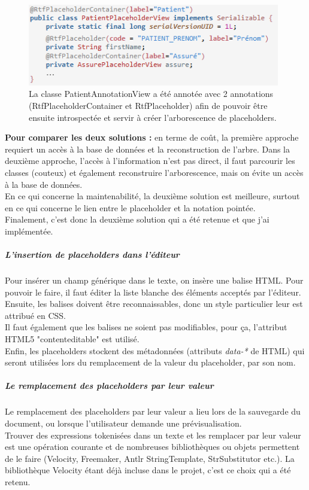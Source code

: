 \begin{figure}[H]
  \centering
  \includegraphics[width=11cm]{./img/annotations1}
  \caption{\label{fig:annotations} La classe PatientAnnotationView a été annotée avec 2 annotations (RtfPlaceholderContainer et RtfPlaceholder) afin de pouvoir être ensuite introspectée et servir à créer l'arborescence de placeholders.}
\end{figure}

\textbf{Pour comparer les deux solutions :} en terme de co\^ut, la première approche requiert un accès à la base de données et la reconstruction de l'arbre. Dans la deuxième approche, l'accès à l'information n'est pas direct, il faut parcourir les classes (couteux) et également reconstruire l'arborescence, mais on évite un accès à la base de données.\\
En ce qui concerne la maintenabilité, la deuxième solution est meilleure, surtout en ce qui concerne le lien entre le placeholder et la notation pointée.\\
Finalement, c'est donc la deuxième solution qui a été retenue et que j'ai implémentée.

\subparagraph*{L'insertion de placeholders dans l'éditeur}
Pour insérer un champ générique dans le texte, on insère une balise HTML. Pour pouvoir le faire, il faut éditer la liste blanche des éléments acceptés par l'éditeur. Ensuite, les balises doivent être reconnaissables, donc un style particulier leur est attribué en CSS.\\
Il faut également que les balises ne soient pas modifiables, pour ça, l'attribut HTML5 "contenteditable" est utilisé.\\
Enfin, les placeholders stockent des métadonnées  (attributs \textit{data-*} de HTML) qui seront utilisées lors du remplacement de la valeur du placeholder, par son nom.

\subparagraph*{Le remplacement des placeholders par leur valeur}
Le remplacement des placeholders par leur valeur a lieu lors de la sauvegarde du document, ou lorsque l'utilisateur demande une prévisualisation.\\

Trouver des expressions tokenisées dans un texte et les remplacer par leur valeur est une opération courante et de nombreuses bibliothèques ou objets permettent de le faire (Velocity, Freemaker, Antlr StringTemplate, StrSubstitutor etc.).
La bibliothèque Velocity étant déjà incluse dans le projet, c'est ce choix qui a été retenu.\\


